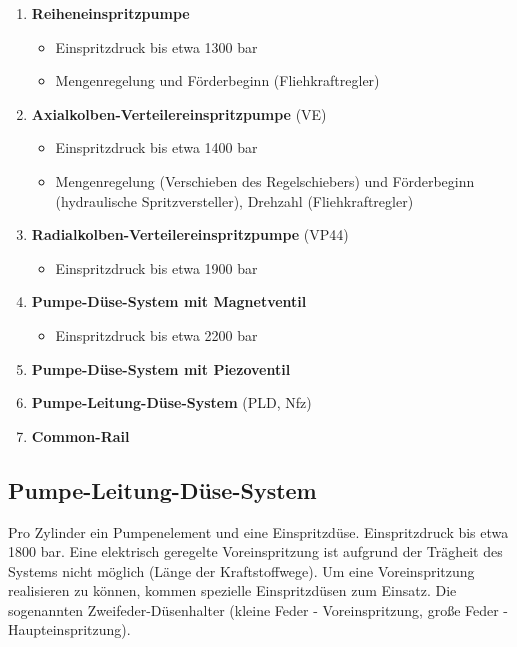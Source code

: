 \begin{enumerate}
\item
  \textbf{Reiheneinspritzpumpe}

  \begin{itemize}
  \item
    Einspritzdruck bis etwa 1300 bar
  \item
    Mengenregelung und Förderbeginn (Fliehkraftregler)
  \end{itemize}
\item
  \textbf{Axialkolben-Verteilereinspritzpumpe} (VE)

  \begin{itemize}
  \item
    Einspritzdruck bis etwa 1400 bar
  \item
    Mengenregelung (Verschieben des Regelschiebers) und Förderbeginn
    (hydraulische Spritzversteller), Drehzahl (Fliehkraftregler)
  \end{itemize}
\item
  \textbf{Radialkolben-Verteilereinspritzpumpe} (VP44)

  \begin{itemize}
  \item
    Einspritzdruck bis etwa 1900 bar
  \end{itemize}
\item
  \textbf{Pumpe-Düse-System mit Magnetventil}

  \begin{itemize}
  \item
    Einspritzdruck bis etwa 2200 bar
  \end{itemize}
\item
  \textbf{Pumpe-Düse-System mit Piezoventil}
\item
  \textbf{Pumpe-Leitung-Düse-System} (PLD, Nfz)
\item
  \textbf{Common-Rail}
\end{enumerate}

\subsection{Pumpe-Leitung-Düse-System}\label{pumpe-leitung-duese-system}

Pro Zylinder ein Pumpenelement und eine Einspritzdüse. Einspritzdruck
bis etwa 1800 bar. Eine elektrisch geregelte Voreinspritzung ist
aufgrund der Trägheit des Systems nicht möglich (Länge der
Kraftstoffwege). Um eine Voreinspritzung realisieren zu können, kommen
spezielle Einspritzdüsen zum Einsatz. Die sogenannten
Zweifeder-Düsenhalter (kleine Feder - Voreinspritzung, große Feder -
Haupteinspritzung).

